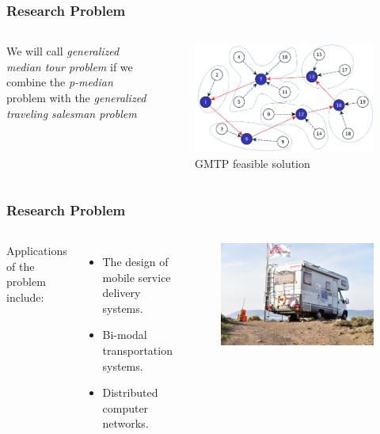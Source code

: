\documentclass[aspectratio=169]{beamer}
\begin{document}
\begin{frame}
\frametitle{Research Problem}
\begin{columns}
We will call \textit{generalized median tour problem} if we combine the \textit{p-median} problem with the \textit{generalized traveling salesman problem}

    \begin{figure}[ht]
    \centering
    \includegraphics[width=\textwidth]{images/grafo-GMTP-2.pdf}
    \caption{GMTP feasible solution}
    \end{figure}
\end{columns}
\end{frame}


\begin{frame}
\frametitle{Research Problem}
\begin{columns}
Applications of the problem include:
\begin{itemize}
\item The design of mobile service delivery systems.
\item Bi-modal transportation systems.
\item Distributed computer networks.
\end{itemize}

    \begin{figure}[ht]
    \centering
    \includegraphics[width=\textwidth]{images/doctors}
    \end{figure}
\end{columns}
\end{frame}
\end{document}
